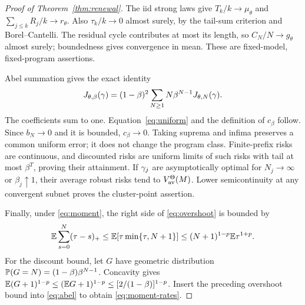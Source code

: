 \begin{proof}[Proof of Theorem~\ref{thm:renewal}]
The iid strong laws give $T_k/k\to\mu_\theta$ and $\sum_{j\le k}R_j/k\to r_\theta$. Also $\tau_k/k\to0$ almost surely, by the tail-sum criterion and Borel--Cantelli. The residual cycle contributes at most its length, so $C_N/N\to g_\theta$ almost surely; boundedness gives convergence in mean. These are fixed-model, fixed-program assertions.

Abel summation gives the exact identity
\begin{equation}\label{eq:abel}
 J_{\theta,\beta}(\gamma)
 =(1-\beta)^2\sum_{N\ge1}N\beta^{N-1}J_{\theta,N}(\gamma).
\end{equation}
The coefficients sum to one. Equation~\eqref{eq:uniform} and the definition of $c_\beta$ follow. Since $b_N\to0$ and it is bounded, $c_\beta\to0$. Taking suprema and infima preserves a common uniform error; it does not change the program class. Finite-prefix risks are continuous, and discounted risks are uniform limits of such risks with tail at most $\beta^T$, proving their attainment. If $\gamma_j$ are asymptotically optimal for $N_j\to\infty$ or $\beta_j\uparrow1$, their average robust risks tend to $V_{\mathrm{av}}^\Theta(M)$. Lower semicontinuity at any convergent subnet proves the cluster-point assertion.

Finally, under \eqref{eq:moment}, the right side of \eqref{eq:overshoot} is bounded by
\[
 \mathbb E\sum_{s=0}^N(\tau-s)_+
 \le\mathbb E[\tau\min\{\tau,N+1\}]
 \le (N+1)^{1-p}\mathbb E\tau^{1+p}.
\]
For the discount bound, let $G$ have geometric distribution
$\mathbb P(G=N)=(1-\beta)\beta^{N-1}$. Concavity gives
$\mathbb E(G+1)^{1-p}\le(\mathbb E G+1)^{1-p}\le[2/(1-\beta)]^{1-p}$.
Insert the preceding overshoot bound into \eqref{eq:abel} to obtain \eqref{eq:moment-rates}.
\end{proof}

